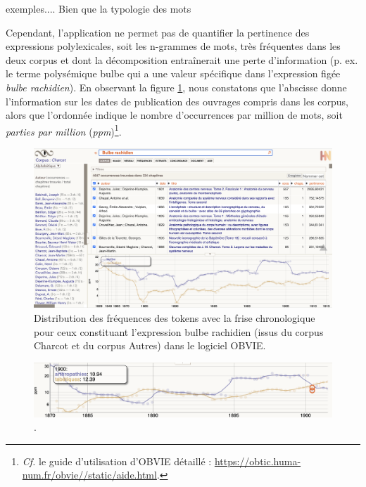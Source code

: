exemples....
Bien que la typologie des mots 

Cependant, l'application ne permet pas de quantifier la pertinence des expressions polylexicales, soit les n-grammes de mots, très fréquentes dans les deux corpus et dont la décomposition entraînerait une perte d'information (p. ex. le terme polysémique \og{}bulbe\fg{} qui a une valeur spécifique dans l'expression figée \textit{bulbe rachidien}). En observant la figure \ref{fig:bulbe}, nous constatons que l'abscisse donne l'information sur les dates de publication des ouvrages compris dans les corpus, alors que l'ordonnée indique le nombre d'occurrences par million de mots, soit \textit{parties par million} (\textit{ppm})\footnote{\textit{Cf.} le guide d'utilisation d'\textsc{OBVIE} détaillé : \url{https://obtic.huma-num.fr/obvie//static/aide.html}.}. 
\begin{figure}[h]
    \centering
    \includegraphics[width=1\textwidth]{img/bulbe_rachidien_mini.png}
    \caption{Distribution des fréquences des tokens avec la frise chronologique pour ceux constituant l'expression \og{}bulbe rachidien\fg{} (issus du corpus \og{}Charcot\fg{} et du corpus \og{}Autres\fg{}) dans le logiciel OBVIE.
    }
    \label{fig:bulbe}
\end{figure}

\begin{figure}[h]
	\centering
	\includegraphics[width=1\textwidth]{img/arthropathies_tabetiques.png}
	\caption{.
	}
	\label{fig:arthropathies}
\end{figure}

